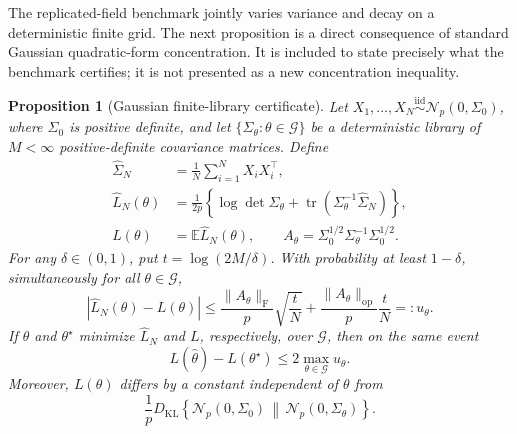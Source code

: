 \documentclass[11pt]{article}
\newtheorem{proposition}{Proposition}
\theoremstyle{remark}
\newcommand{\E}{\mathbb E}
\newcommand{\tr}{\operatorname{tr}}
\newcommand{\KL}{D_{\mathrm{KL}}}
\newcommand{\Normal}{\mathcal N}
\begin{document}
The replicated-field benchmark jointly varies variance and decay on a
deterministic finite grid.  The next proposition is a direct consequence of
standard Gaussian quadratic-form concentration.  It is included to state
precisely what the benchmark certifies; it is not presented as a new
concentration inequality.

\begin{proposition}[Gaussian finite-library certificate]
\label{prop:finite-library}
Let \(X_1,\ldots,X_N\overset{\mathrm{iid}}{\sim}\Normal_p(0,\Sigma_0)\), where
\(\Sigma_0\) is positive definite, and let
\(\{\Sigma_\theta:\theta\in\mathcal G\}\) be a deterministic library of
\(M<\infty\) positive-definite covariance matrices.  Define
\begin{align}
  \widehat\Sigma_N&=\frac1N\sum_{i=1}^N X_iX_i^\top,\nonumber\\
  \widehat L_N(\theta)
  &=\frac1{2p}\left\{\log\det\Sigma_\theta
    +\tr(\Sigma_\theta^{-1}\widehat\Sigma_N)\right\},
    \label{eq:empirical-library-risk}\\
  L(\theta)&=\E\widehat L_N(\theta),\qquad
  A_\theta=\Sigma_0^{1/2}\Sigma_\theta^{-1}\Sigma_0^{1/2}.
  \nonumber
\end{align}
For any \(\delta\in(0,1)\), put \(t=\log(2M/\delta)\).  With probability at
least \(1-\delta\), simultaneously for all \(\theta\in\mathcal G\),
\begin{equation}
  \left|\widehat L_N(\theta)-L(\theta)\right|
  \leq
  \frac{\lVert A_\theta\rVert_{\mathrm F}}p\sqrt{\frac tN}
  +\frac{\lVert A_\theta\rVert_{\mathrm{op}}}p\frac tN
  =:u_\theta.
  \label{eq:finite-library-certificate}
\end{equation}
If \(\widehat\theta\) and \(\theta^\star\) minimize \(\widehat L_N\) and
\(L\), respectively, over \(\mathcal G\), then on the same event
\begin{equation}
  L(\widehat\theta)-L(\theta^\star)
  \leq 2\max_{\theta\in\mathcal G}u_\theta.
  \label{eq:finite-library-erm}
\end{equation}
Moreover, \(L(\theta)\) differs by a constant independent of \(\theta\) from
\begin{equation}
  \frac1p\KL\!\left\{\Normal_p(0,\Sigma_0)\,\middle\|\,
  \Normal_p(0,\Sigma_\theta)\right\}.
  \label{eq:library-kl-relation}
\end{equation}
\end{proposition}
\end{document}
